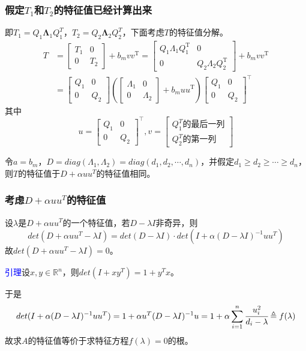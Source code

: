 \documentclass[notheorems,serif]{beamer}
\begin{document}
\begin{frame}
\frametitle{假定$T_1$和$T_2$的特征值已经计算出来}
即$T_1=Q_1\boldsymbol{\Lambda}_1Q_1^T$，$T_2=Q_2\boldsymbol{\Lambda}_2Q_2^T$，下面考虑$T$的特征值分解。
$$
\begin{aligned} T&=\left[\begin{array}{cc}{T_{1}} & {0} \\ {0} & {T_{2}}\end{array}\right]+b_{m} v v^{\mathrm{T}} =\left[\begin{array}{cc}{Q_{1} \Lambda_{1} Q_{1}^{\mathrm{T}}} & {0} \\ {0} & {Q_{2} \Lambda_{2} Q_{2}^{\mathrm{T}}}\end{array}\right]+b_{m} v v^{\mathrm{T}} \\ &=\left[\begin{array}{cc}{Q_{1}} & {0} \\ {0} & {Q_{2}}\end{array}\right]\left(\left[\begin{array}{cc}{\Lambda_{1}} & {0} \\ {0} & {\Lambda_{2}}\end{array}\right]+b_{m} u u^{\mathrm{T}}\right)\left[\begin{array}{cc}{Q_{1}} & {0} \\ {0} & {Q_{2}}\end{array}\right]^{\top} \end{aligned}
$$
其中$$
u=\left[\begin{array}{cc}{Q_{1}} & {0} \\ {0} & {Q_{2}}\end{array}\right]^{\top}
,v=\left[\begin{array}{c}
Q_1^T\mbox{的最后一列}\\Q_2^T\mbox{的第一列}
\end{array}\right]$$

令$a=b_m$，$D=diag(\Lambda_1,\Lambda_2)=diag(d_1,d_2,\cdots ,d_n)$，并假定$d_1\ge d_2\ge \cdots \ge d_n$，则$T$的特征值于$D+\alpha uu^T$的特征值相同。
\end{frame}
\begin{frame}
\frametitle{考虑$D+\alpha uu^T$的特征值}


设$\lambda$是$D+\alpha uu^T$的一个特征值，若$D-\lambda I$非奇异，则$$det(D+\alpha uu^T-\lambda I)=det(D-\lambda I)\cdot det(I+\alpha(D-\lambda I)^{-1}uu^T)$$
故$det(D+\alpha uu^T-\lambda I)=0$。

\textcolor{blue}{引理}\quad 设$x,y\in \mathbb R^n$，则$det(I+xy^T)=1+y^Tx$。

于是$$det(I+\alpha(D-\lambda I)^{-1}uu^T)=1+\alpha u^T(D-\lambda I)^{-1}u=1+\alpha \sum_{i=1}^{n}\cfrac{u_i^2}{d_i-\lambda} \triangleq f(\lambda)$$
故求$A$的特征值等价于求特征方程$f(\lambda)=0$的根。\\
\end{frame}
\end{document}
